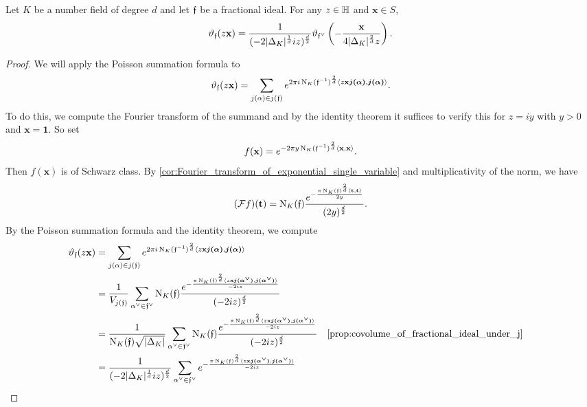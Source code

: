       \begin{theorem}\label{thm:functional_equation_Hecke_theta}
        Let $K$ be a number field of degree $d$ and let $\mathfrak{f}$ be a fractional ideal. For any $z \in \mathbb{H}$ and $\mathbf{x} \in S$,
        \[
          \vartheta_{\mathfrak{f}}(z\mathbf{x}) = \frac{1}{(-2|\Delta_{K}|^{\frac{1}{d}}iz)^{\frac{d}{2}}}\vartheta_{\mathfrak{f}^{\vee}}\left(-\frac{\mathbf{x}}{4|\Delta_{K}|^{\frac{2}{d}}z}\right).
        \]
      \end{theorem}
      \begin{proof}
        We will apply the Poisson summation formula to
        \[
          \vartheta_{\mathfrak{f}}(z\mathbf{x}) = \sum_{j(\alpha) \in j(\mathfrak{f})}e^{2\pi i\operatorname{\mathrm{N}}_{K}(\mathfrak{f}^{-1})^{\frac{2}{d}}\langle z\mathbf{x}\boldsymbol{j(\alpha)},\boldsymbol{j(\alpha)}\rangle}.
        \]
        To do this, we compute the Fourier transform of the summand and by the identity theorem it suffices to verify this for $z = iy$ with $y > 0$ and $\mathbf{x} = \mathbf{1}$. So set
        \[
          f(\mathbf{x}) = e^{-2\pi y\operatorname{\mathrm{N}}_{K}(\mathfrak{f}^{-1})^{\frac{2}{d}}\langle\mathbf{x},\mathbf{x}\rangle}.
        \]
        Then $f(\mathbf{x})$ is of Schwarz class. By \cref{cor:Fourier_transform_of_exponential_single_variable} and multiplicativity of the norm, we have
        \[
          (\mathcal{F}f)(\mathbf{t}) = \operatorname{\mathrm{N}}_{K}(\mathfrak{f})\frac{e^{-\frac{\pi\operatorname{\mathrm{N}}_{K}(\mathfrak{f})^{\frac{2}{d}}\langle\mathbf{t},\mathbf{t}\rangle}{2y}}}{(2y)^{\frac{d}{2}}}.
        \]
        By the Poisson summation formula and the identity theorem, we compute
        \begin{align*}
          \vt_{\mf{f}}(z\mathbf{x}) &= \sum_{j(\a) \in j(\mf{f})}e^{2\pi i\Norm_{K}(\mf{f}^{-1})^{\frac{2}{d}}\<z\mathbf{x}\boldsymbol{j(\a)},\boldsymbol{j(\a)}\>} \\
          &= \frac{1}{V_{j(\mf{f})}}\sum_{\a^{\vee} \in \mf{f}^{\vee}}\Norm_{K}(\mf{f})\frac{e^{-\frac{\pi\Norm_{K}(\mf{f})^{\frac{2}{d}}\<z\mathbf{x}\boldsymbol{j(\a^{\vee})},\boldsymbol{j(\a^{\vee})}\>}{-2iz}}}{(-2iz)^{\frac{d}{2}}} \\
          &= \frac{1}{\Norm_{K}(\mf{f})\sqrt{|\D_{K}|}}\sum_{\a^{\vee} \in \mf{f}^{\vee}}\Norm_{K}(\mf{f})\frac{e^{-\frac{\pi\Norm_{K}(\mf{f})^{\frac{2}{d}}\<z\mathbf{x}\boldsymbol{j(\a^{\vee})},\boldsymbol{j(\a^{\vee})}\>}{-2iz}}}{(-2iz)^{\frac{d}{2}}} && \text{\cref{prop:covolume_of_fractional_ideal_under_j}} \\
          &= \frac{1}{(-2|\D_{K}|^{\frac{1}{d}}iz)^{\frac{d}{2}}}\sum_{\a^{\vee} \in \mf{f}^{\vee}}e^{-\frac{\pi\Norm_{K}(\mf{f})^{\frac{2}{d}}\<z\mathbf{x}\boldsymbol{j(\a^{\vee})},\boldsymbol{j(\a^{\vee})}\>}{-2iz}} \\

\end{align*}
\end{proof}
